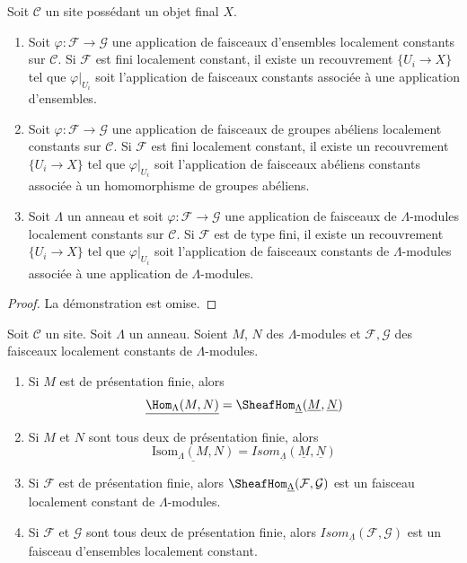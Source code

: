 \begin{lemma}
\label{lemma-morphism-locally-constant}
Soit $\mathcal{C}$ un site possédant un objet final $X$.
\begin{enumerate}
\item Soit $\varphi : \mathcal{F} \to \mathcal{G}$ une application de
faisceaux d'ensembles localement constants sur $\mathcal{C}$. Si
$\mathcal{F}$ est fini localement constant, il existe un recouvrement
$\{U_i \to X\}$ tel que $\varphi|_{U_i}$ soit l'application de faisceaux
constants associée à une application d'ensembles.
\item Soit $\varphi : \mathcal{F} \to \mathcal{G}$ une application de
faisceaux de groupes abéliens localement constants sur $\mathcal{C}$. Si
$\mathcal{F}$ est fini localement constant, il existe un recouvrement
$\{U_i \to X\}$ tel que $\varphi|_{U_i}$ soit l'application de faisceaux
abéliens constants associée à un homomorphisme de groupes abéliens.
\item Soit $\Lambda$ un anneau et soit
$\varphi : \mathcal{F} \to \mathcal{G}$ une application de faisceaux de
$\Lambda$-modules localement constants sur $\mathcal{C}$. Si $\mathcal{F}$
est de type fini, il existe un recouvrement $\{U_i \to X\}$ tel que
$\varphi|_{U_i}$ soit l'application de faisceaux constants de
$\Lambda$-modules associée à une application de $\Lambda$-modules.
\end{enumerate}
\end{lemma}

\begin{proof}
La démonstration est omise.
\end{proof}

\begin{lemma}
\label{lemma-locally-constant}
Soit $\mathcal{C}$ un site. Soit $\Lambda$ un anneau. Soient $M$, $N$ des
$\Lambda$-modules et $\mathcal{F}, \mathcal{G}$ des faisceaux localement
constants de $\Lambda$-modules.
\begin{enumerate}
\item Si $M$ est de présentation finie, alors
$$
\underline{\Hom_\Lambda(M, N)} =
\SheafHom_{\underline{\Lambda}}(\underline{M}, \underline{N})
$$
\item Si $M$ et $N$ sont tous deux de présentation finie, alors
$$
\underline{\text{Isom}_\Lambda(M, N)} =
\mathit{Isom}_{\underline{\Lambda}}(\underline{M}, \underline{N})
$$
\item Si $\mathcal{F}$ est de présentation finie, alors
$\SheafHom_{\underline{\Lambda}}(\mathcal{F}, \mathcal{G})$
est un faisceau localement constant de $\Lambda$-modules.
\item Si $\mathcal{F}$ et $\mathcal{G}$ sont tous deux de présentation finie, alors
$\mathit{Isom}_{\underline{\Lambda}}(\mathcal{F}, \mathcal{G})$
est un faisceau d'ensembles localement constant.
\end{enumerate}
\end{lemma}

